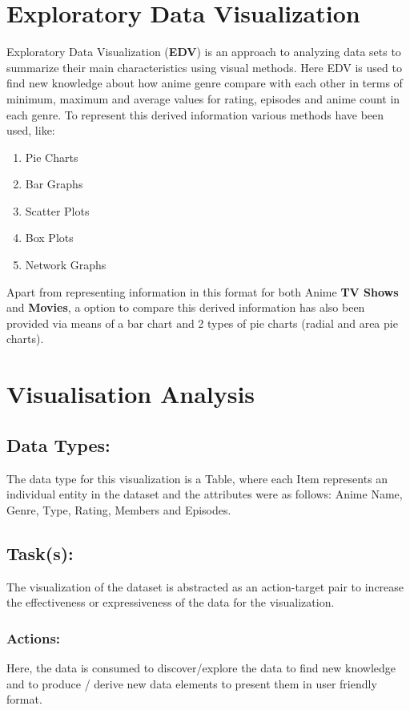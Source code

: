 \documentclass[a4paper, 10pt]{article}
\begin{document}
\section{Exploratory Data Visualization}
    \qquad Exploratory Data Visualization (\textbf{EDV}) is an approach to analyzing data sets to summarize their main characteristics using visual methods. Here EDV is used to find new knowledge about how anime genre compare with each other in terms of minimum, maximum and average values for rating, episodes and anime count in each genre. To represent this derived information various methods have been used, like:
    \begin{enumerate}
        \item Pie Charts
        \item Bar Graphs
        \item Scatter Plots
        \item Box Plots
        \item Network Graphs
    \end{enumerate}
    \qquad Apart from representing information in this format for both Anime \textbf{TV Shows} and \textbf{Movies}, a option to compare this derived information has also been provided via means of a bar chart and 2 types of pie charts (radial and area pie charts).
    
\section{Visualisation Analysis}
    \subsection{Data Types:}
    \qquad The data type for this visualization is a Table, where each Item represents an individual entity in the dataset and the attributes were as follows: Anime Name, Genre, Type, Rating, Members and Episodes.
    
    \subsection{Task(s):}
    \qquad The visualization of the dataset is abstracted as an action-target pair to increase the effectiveness or expressiveness of the data for the visualization.
    \subsubsection{Actions:}
    \qquad Here, the data is consumed to discover/explore the data to find new knowledge and to produce / derive new data elements to present them in user friendly format.
\end{document}
